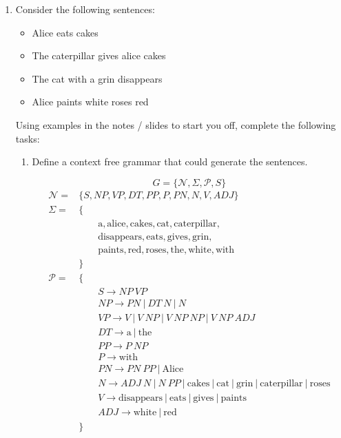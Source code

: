 \documentclass[10pt,\jkfside,a4paper]{article}
\newcommand{\np}{\ensuremath{N\!P}}
\newcommand{\vp}{\ensuremath{V\!P}}
\newcommand{\pp}{\ensuremath{P\!P}}
\newcommand{\adj}{\ensuremath{ADJ}}
\newcommand{\pn}{\ensuremath{P\!N}}
\newcommand{\dt}{\ensuremath{DT}}
\begin{document}
\begin{enumerate}

\item Consider the following sentences:

\begin{itemize}

\item Alice eats cakes

\item The caterpillar gives alice cakes

\item The cat with a grin disappears

\item Alice paints white roses red

\end{itemize}

Using examples in the notes / slides to start you off, complete the
following tasks:

\begin{enumerate}

\item Define a context free grammar that could generate the sentences.

\[
G = \{\mathcal N, \Sigma, \mathcal P, S\}
\]
\begin{align*}
\mathcal N =& \{S, \np, \vp, \dt, \pp, P, \pn, N, V, \adj\} \\
\Sigma =& \{ \\
&\qquad \text{a}, \text{alice}, \text{cakes}, \text{cat},
\text{caterpillar}, \\
&\qquad \text{disappears}, \text{eats},
\text{gives}, \text{grin}, \\
&\qquad \text{paints}, \text{red}, \text{roses},
\text{the}, \text{white}, \text{with} \\
& \} \\
\mathcal P =& \{ \\
&\qquad S \to \np\ \vp \\
&\qquad \np \to \pn\ |\ \dt\ N\ |\ N \\
&\qquad \vp \to V\ |\ V\ \np\ |\ V\ \np\ \np\ |\ V\ \np\ \adj \\
&\qquad \dt \to \text{a}\ |\ \text{the} \\
&\qquad \pp \to P\ \np \\
&\qquad P \to \text{with} \\
&\qquad \pn \to \pn\ \pp\ |\ \text{Alice} \\
&\qquad N \to \adj\ N\ |\ N\ \pp \ |\ \text{cakes} \ | \ \text{cat}\ |\
\text{grin}\ |\ \text{caterpillar} \ |\ \text{roses} \\
&\qquad V \to \text{disappears}\ |\ \text{eats} \ |\ \text{gives} \ |\
\text{paints} \\
&\qquad \adj \to \text{white}\ |\ \text{red} \\
&\}
\end{align*}


\end{enumerate}
\end{enumerate}
\end{document}
